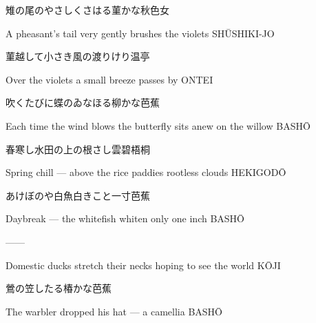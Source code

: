 \begin{haiku}
    {\FH 雉の尾のやさしくさはる菫かな}\hfill{\FH 秋色女}

    \vin{} A pheasant's tail
    \vin{} \vin{} very gently brushes
    \vin{} \vin{} \vin{} the violets \hspace{\fill} SH\={U}SHIKI-JO
\end{haiku}

\begin{haiku}
    {\FH 菫越して小さき風の渡りけり}\hfill{\FH 温亭}

    \vin{} Over the violets
    \vin{} \vin{} a small breeze
    \vin{} \vin{} \vin{} passes by \hspace{\fill} ONTEI
\end{haiku}

\begin{haiku}
    {\FH 吹くたびに蝶のゐなほる柳かな}\hfill{\FH 芭蕉}

    \vin{} Each time the wind blows
    \vin{} \vin{} the butterfly sits anew
    \vin{} \vin{} \vin{} on the willow \hspace{\fill} BASH\={O}
\end{haiku}

\begin{haiku}
    {\FH 春寒し水田の上の根さし雲}\hfill{\FH 碧梧桐}

    \vin{} Spring chill ---
    \vin{} \vin{} above the rice paddies
    \vin{} \vin{} \vin{} rootless clouds \hspace{\fill} HEKIGOD\={O}
\end{haiku}

\begin{haiku}
    {\FH あけぼのや白魚白きこと一寸}\hfill{\FH 芭蕉}

    \vin{} Daybreak ---
    \vin{} \vin{} the whitefish whiten
    \vin{} \vin{} \vin{} only one inch \hspace{\fill} BASH\={O}
\end{haiku}

\begin{haiku}
    {---}\hfill{---}

    \vin{} Domestic ducks
    \vin{} \vin{} stretch their necks
    \vin{} \vin{} \vin{} hoping to see the world \hspace{\fill} K\={O}JI
\end{haiku}

\begin{haiku}
    {\FH 鶯の笠したる椿かな}\hfill{\FH 芭蕉}

    \vin{} The warbler
    \vin{} \vin{} dropped his hat ---
    \vin{} \vin{} \vin{} a camellia \hspace{\fill} BASH\={O}
\end{haiku}

